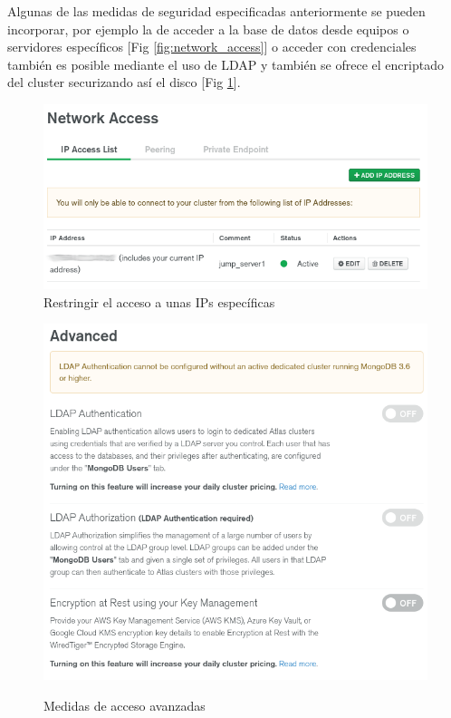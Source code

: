 \documentclass[10pt,a4paper]{article}
\begin{document}
Algunas de las medidas de seguridad especificadas anteriormente se pueden incorporar, por ejemplo la de acceder a la base de datos desde equipos o servidores específicos [Fig \ref{fig:network_access}] o acceder con credenciales también es posible mediante el uso de LDAP y también se ofrece el encriptado del cluster securizando así el disco [Fig \ref{fig:advanced_access}].
\begin{figure}[ht]
  \centering
  \includegraphics[scale=0.3]{network_access.png}\\
  \caption{Restringir el acceso a unas IPs específicas}
  \label{fig:network_access}

  \includegraphics[scale=0.3]{advanced.png}\\
  \caption{Medidas de acceso avanzadas}
  \label{fig:advanced_access}
\end{figure}
\end{document}
